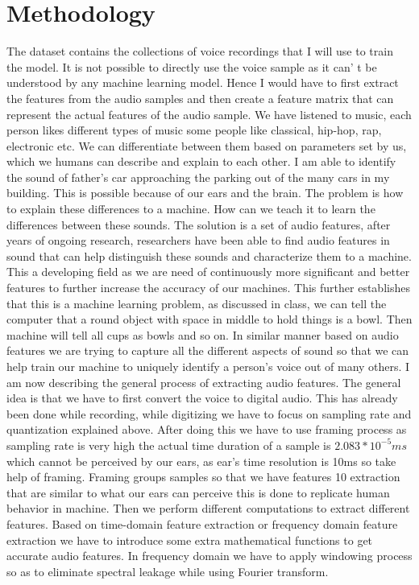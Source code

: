 \documentclass[11pt,a4paper]{article}
\begin{document}
	\section{Methodology}
	The dataset contains the collections of voice recordings that I will use to train the model. It is not possible to directly use the voice sample as it can' t be understood by any machine learning model. Hence I would have to first extract the features from the audio samples and then create a feature matrix that can represent the actual features of the audio sample. We have listened to music, each person likes different types of music some people like classical, hip-hop, rap, electronic etc. We can differentiate between them based on parameters set by us, which we humans can describe and explain to each other. I am able to identify the sound of father’s car approaching the parking out of the many cars in my building. This is possible because of our ears and the brain. The problem is how to explain these differences to a machine. How can we teach it to learn the differences between these sounds. The solution is a set of audio features, after years of ongoing research, researchers have been able to find audio features in sound that can help distinguish these sounds and characterize them to a machine. This a developing field as we are need of continuously more significant and better features to further increase the accuracy of our machines. This further establishes that this is a machine learning problem, as discussed in class, we can tell the computer that a round object with space in middle to hold things is a bowl. Then machine will tell all cups as bowls and so on. In similar manner based on audio features we are trying to capture all the different aspects of sound so that we can help train our machine to uniquely identify a person’s voice out of many others. I am now describing the general process of extracting audio features. The general idea is that we have to first convert the voice to digital audio. This has already been done while recording, while digitizing we have to focus on sampling rate and quantization explained above. After doing this we have to use framing process as sampling rate is very high the actual time duration of a sample is $2.083 * 10^{-5} ms$ which cannot be perceived by our ears, as ear’s time resolution is 10ms so take help of framing. Framing groups samples so that we have features 10 extraction that are similar to what our ears can perceive this is done to replicate human behavior in machine. Then we perform different computations to extract different features. Based on time-domain feature extraction or frequency domain feature extraction we have to introduce some extra mathematical functions to get accurate audio features. In frequency domain we have to apply windowing process so as to eliminate spectral leakage while using Fourier transform.
\end{document}
